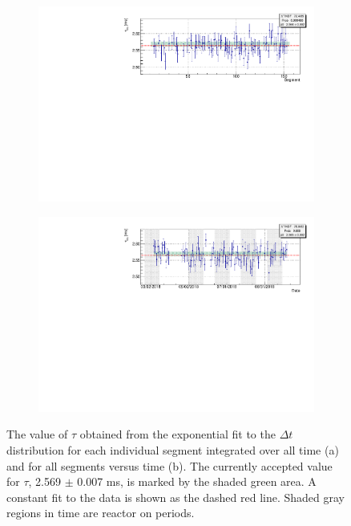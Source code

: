 \begin{figure}[h]
	\begin{subfigure}{1\linewidth}
	\centering
	\includegraphics[width=0.8\linewidth]{tex/6-ac227-images/AD_RateCalc/LifetimePerCell}
	\caption{}
	\label{fig:lifetimepercell}
\end{subfigure}
\begin{subfigure}{1\linewidth}
	\centering
	\includegraphics[width=0.8\linewidth]{tex/6-ac227-images/AD_RateCalc/LifetimeVsTime}
	\caption{}
	\label{fig:lifetimevstime}
\end{subfigure}
\caption{The value of $\tau$ obtained from the exponential fit to the $\Delta t$ distribution for each individual segment integrated over all time (a) and for all segments versus time (b). The currently accepted value for $\tau$, 2.569 $\pm$ 0.007 ms, is marked by the shaded green area. A constant fit to the data is shown as the dashed red line. Shaded gray regions in time are reactor on periods.}
\label{fig:tau}
\end{figure}

